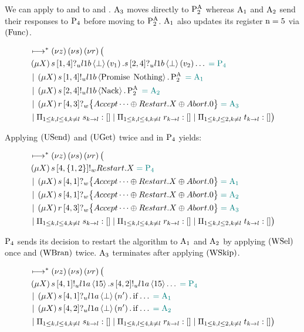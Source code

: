 We can apply \RIfT to  and \RIfF to  and .
$\Acceptor{3}$ moves directly to $\PaTwo$ whereas $\Acceptor{1}$ and $\Acceptor{2}$ send their responses to $\Proposer{4}$ before moving to $\PaTwo$.
$\Acceptor{1}$ also updates its register $\NumberRegister = 5$ via $\RSideEffect$.

\begin{align*}
&\mapstostar \NuChannels \big (\\
&\Mu{\RecursionVariable} \ReceiveUnreliableP{s}{1}{4}{\LOneB}{\bot}{v_1}.\ReceiveUnreliableP{s}{2}{4}{\LOneB}{\bot}{v_2}\dots \comment{= \Proposer{4}}\\
&\Or \Mu{\RecursionVariable} \SendUnreliableP{s}{1}{4}{\LOneB}{\Promise{\Nothing}}.\PaTwo \comment{= \Acceptor{1}}\\
&\Or \Mu{\RecursionVariable} \SendUnreliableP{s}{2}{4}{\LOneB}{\Nack}.\PaTwo \comment{= \Acceptor{2}}\\
&\Or \Mu{\RecursionVariable} \ReceiveWeaklyP{r}{4}{3}{\BeginPaCont} \comment{= \Acceptor{3}}\\
&\Or \InnerSessionQueues{s}
\Or \InnerSessionQueues{r}
\Or \OuterSessionQueues
\big )
\end{align*}

Applying $\RUsend$ and $\RUget$ twice and \RIfT in $\Proposer{4}$ yields:

\begin{align*}
&\mapstostar \NuChannels \big (\\
&\Mu{\RecursionVariable} \SendWeaklyP{s}{4}{\Curly{1,2}}{\Restart}{\RecursionVariable} \comment{= \Proposer{4}}\\
&\Or \Mu{\RecursionVariable} \ReceiveWeaklyP{s}{4}{1}{\BeginPaCont} \comment{= \Acceptor{1}}\\
&\Or \Mu{\RecursionVariable} \ReceiveWeaklyP{s}{4}{1}{\BeginPaCont} \comment{= \Acceptor{2}}\\
&\Or \Mu{\RecursionVariable} \ReceiveWeaklyP{r}{4}{3}{\BeginPaCont} \comment{= \Acceptor{3}}\\
&\Or \InnerSessionQueues{s}
\Or \InnerSessionQueues{r}
\Or \OuterSessionQueues
\big )
\end{align*}

$\Proposer{4}$ sends its decision to restart the algorithm to $\Acceptor{1}$ and $\Acceptor{2}$ by applying $\RWsel$ once and $\RWbran$ twice.
$\Acceptor{3}$ terminates after applying $\RWskip$.

\begin{align*}
&\mapstostar \NuChannels \big (\\
&\Mu{\RecursionVariable} \SendUnreliableP{s}{4}{1}{\LOneA}{15}.\SendUnreliableP{s}{4}{2}{\LOneA}{15}\dots \comment{= \Proposer{4}}\\
&\Or \Mu{\RecursionVariable} \ReceiveUnreliableP{s}{4}{1}{\LOneA}{\bot}{n'}.\If{\dots} \comment{= \Acceptor{1}}\\
&\Or \Mu{\RecursionVariable} \ReceiveUnreliableP{s}{4}{2}{\LOneA}{\bot}{n'}.\If{\dots} \comment{= \Acceptor{2}}\\
&\Or \InnerSessionQueues{s}
\Or \InnerSessionQueues{r}
\Or \OuterSessionQueues
\big )
\end{align*}

